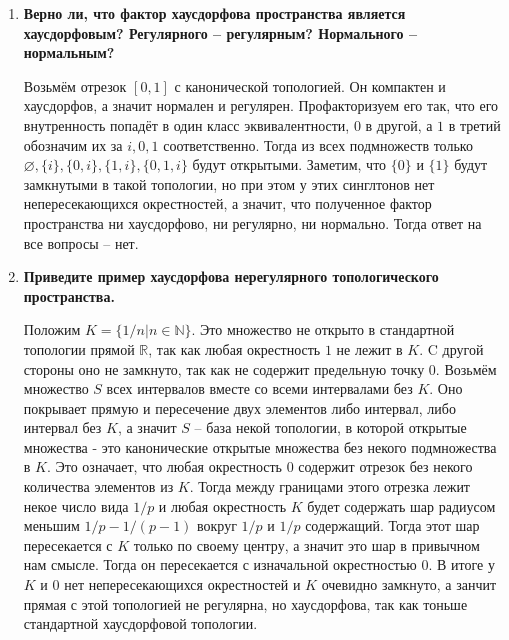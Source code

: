 \documentclass{article}
\begin{document}
\begin{enumerate}
    \item \textbf{Верно ли, что фактор хаусдорфова пространства является
        хаусдорфовым? Регулярного – регулярным? Нормального – нормальным?}

        Возьмём отрезок $[0,1]$ с канонической топологией. Он компактен и
        хаусдорфов, а значит нормален и регулярен. Профакторизуем его так, что
        его внутренность попадёт в один класс эквивалентности, $0$ в другой,
        а $1$ в третий обозначим их за $i,0,1$ соответственно. Тогда из всех
        подмножеств только $\varnothing, \{i\},\{0, i\},\{1,i\},\{0,1,i\}$
        будут открытыми. Заметим, что  $\{0\}$ и $\{1\}$ будут замкнутыми в
        такой топологии, но при этом у этих синглтонов нет непересекающихся
        окрестностей, а значит, что полученное фактор пространства ни
        хаусдорфово, ни регулярно, ни нормально. Тогда ответ на все вопросы – нет.

    \item \textbf{Приведите пример хаусдорфова нерегулярного топологического
        пространства.}\par
        Положим $K=\{1/n|n\in\mathbb{N}\}$. Это множество не открыто в
        стандартной топологии прямой $\mathbb{R}$, так как любая окрестность
        $1$ не лежит в $K$. C другой стороны оно не замкнуто, так как не
        содержит предельную точку $0$. Возьмём множество $S$ всех
        интервалов вместе со всеми интервалами без $K$. Оно покрывает прямую и
        пересечение двух элементов либо интервал, либо интервал без $K$, а
        значит $S$ – база некой топологии, в которой открытые множества - это
        канонические открытые множества без некого подмножества в $K$. Это
        означает, что любая окрестность $0$ содержит отрезок без некого
        количества элементов из $K$. Тогда между границами этого отрезка лежит
        некое число вида $1/p$ и любая окрестность $K$ будет содержать шар
        радиусом меньшим $1/p-1/(p-1)$ вокруг $1/p$ и $1/p$ содержащий. Тогда
        этот шар пересекается с $K$ только по своему центру, а значит это
        шар в привычном нам смысле. Тогда он пересекается с изначальной
        окрестностью $0$. В итоге у $K$ и $0$ нет непересекающихся окрестностей
        и $K$ очевидно замкнуто, а занчит прямая с этой топологией не регулярна,
        но хаусдорфова, так как тоньше стандартной хаусдорфовой топологии.


\end{enumerate}
\end{document}
